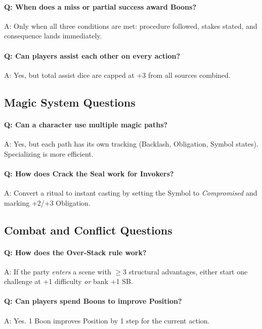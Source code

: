 \paragraph{Q: When does a miss or partial success award Boons?}
A: Only when all three conditions are met: procedure followed, stakes stated, and consequence lands immediately.

\paragraph{Q: Can players assist each other on every action?}
A: Yes, but total assist dice are capped at +3 from all sources combined.

\subsection{Magic System Questions}\label{subsec:magic_questions}
\paragraph{Q: Can a character use multiple magic paths?}
A: Yes, but each path has its own tracking (Backlash, Obligation, Symbol states). Specializing is more efficient.

\paragraph{Q: How does Crack the Seal work for Invokers?}
A: Convert a ritual to instant casting by setting the Symbol to \emph{Compromised} and marking +2/+3 Obligation.

\subsection{Combat and Conflict Questions}\label{subsec:combat_questions}
\paragraph{Q: How does the Over‑Stack rule work?}
A: If the party \emph{enters} a scene with $\geq 3$ structural advantages, either start one challenge at +1 difficulty \emph{or} bank +1 SB.

\paragraph{Q: Can players spend Boons to improve Position?}
A: Yes. 1 Boon improves Position by 1 step for the current action.

